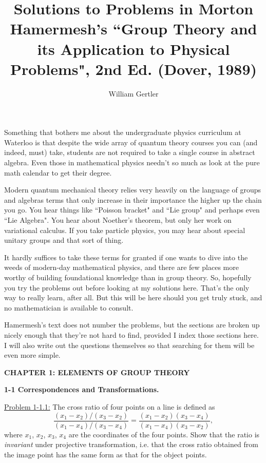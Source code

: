 \documentclass[12pt]{article}
\title{Solutions to Problems in Morton Hamermesh's ``Group Theory and its
Application to Physical Problems", 2nd Ed. (Dover, 1989)}
\author{William Gertler}
\begin{document}
\maketitle

Something that bothers me about the undergraduate physics curriculum at
Waterloo is that despite the wide array of quantum theory courses you can
(and indeed, must) take, students are not required to take a single course in
abstract algebra. Even those in mathematical physics needn't so much as look at
the pure math calendar to get their degree.

Modern quantum mechanical theory relies very heavily on the
language of groups and algebras \textendash terms that only increase in their importance
the higher up the chain you go. You hear things like ``Poisson bracket" and 
``Lie group" and perhaps even ``Lie Algebra". You hear about Noether's theorem,
but only her work on variational calculus. If you take particle physics,
you may hear about special unitary groups and that sort of thing.

It hardly suffices to take these terms for granted if one wants to dive into the
weeds of modern-day mathematical physics, and there are few places more worthy
of building foundational knowledge than in group theory. So, hopefully you try
the problems out before looking at my solutions here. That's the only way to
really learn, after all. But this will be here should you get truly stuck, and
no mathematician is available to consult.

Hamermesh's text does not number the problems, but the sections are broken up
nicely enough that they're not hard to find, provided I index those sections
here. I will also write out the questions themselves so that searching for them
will be even more simple.

\newpage

\textbf{CHAPTER 1: ELEMENTS OF GROUP THEORY}

\textbf{1-1 Correspondences and Transformations.}

\underline{Problem 1-1.1:} The cross ratio of four points on a line is defined
as
\[ 
\frac{(x_1 - x_2)/(x_3 - x_2)}{(x_1-x_4)/(x_3-x_4)} =
\frac{(x_1 - x_2)(x_3 - x_4)}{(x_1-x_4)(x_3-x_2)},
\]
where $x_1$, $x_2$, $x_3$, $x_4$ are the coordinates of the four points. Show
that the ratio is \textit{invariant} under projective transformation, i.e. that
the cross ratio obtained from the image point has the same form as that for the
object points.
\end{document}
